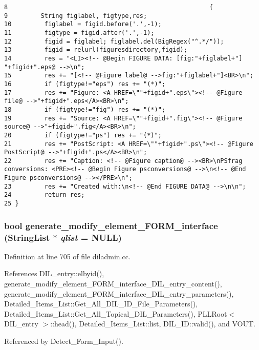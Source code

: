 \footnotesize\begin{verbatim}8                                                       {
9         String figlabel, figtype,res;
10         figlabel = figid.before('.',-1);
11         figtype = figid.after('.',-1);
12         figid = figlabel; figlabel.del(BigRegex("^.*/"));
13         figid = relurl(figuresdirectory,figid);
14         res = "<LI><!-- @Begin FIGURE DATA: [fig:"+figlabel+"] "+figid+".eps@ -->\n";
15         res += "[<!-- @Figure label@ -->fig:"+figlabel+"]<BR>\n";
16         if (figtype!="eps") res += "(*)";
17         res += "Figure: <A HREF=\""+figid+".eps\"><!-- @Figure file@ -->"+figid+".eps</A><BR>\n";
18         if (figtype!="fig") res += "(*)";
19         res += "Source: <A HREF=\""+figid+".fig\"><!-- @Figure source@ -->"+figid+".fig</A><BR>\n";
20         if (figtype!="ps") res += "(*)";
21         res += "PostScript: <A HREF=\""+figid+".ps\"><!-- @Figure PostScript@ -->"+figid+".ps</A><BR>\n";
22         res += "Caption: <!-- @Figure caption@ --><BR>\nPSfrag conversions: <PRE><!-- @Begin Figure psconversions@ -->\n<!-- @End Figure psconversions@ --></PRE>\n";
23         res += "Created with:\n<!-- @End FIGURE DATA@ -->\n\n";
24         return res;
25 }
\end{verbatim}\normalsize 
{}
\subsubsection{\setlength{\rightskip}{0pt plus 5cm}bool generate\_\-modify\_\-element\_\-FORM\_\-interface ({\bf String\-List} $\ast$ {\em qlist} = NULL)}\label{dil2al_8hh_a302}




Definition at line 705 of file diladmin.cc.

References DIL\_\-entry::elbyid(), generate\_\-modify\_\-element\_\-FORM\_\-interface\_\-DIL\_\-entry\_\-content(), generate\_\-modify\_\-element\_\-FORM\_\-interface\_\-DIL\_\-entry\_\-parameters(), Detailed\_\-Items\_\-List::Get\_\-All\_\-DIL\_\-ID\_\-File\_\-Parameters(), Detailed\_\-Items\_\-List::Get\_\-All\_\-Topical\_\-DIL\_\-Parameters(), PLLRoot$<$ DIL\_\-entry $>$::head(), Detailed\_\-Items\_\-List::list, DIL\_\-ID::valid(), and VOUT.

Referenced by Detect\_\-Form\_\-Input().



